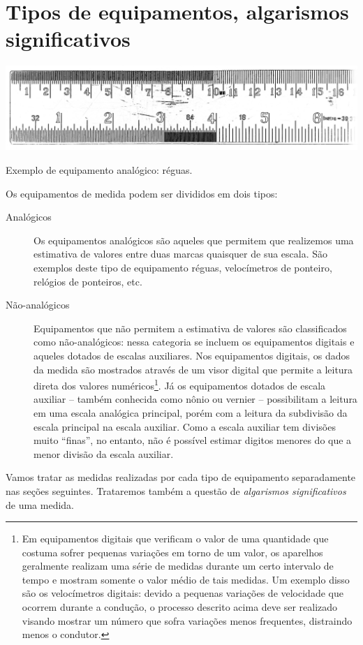 \section{Tipos de equipamentos, algarismos significativos}

\begin{marginfigure}
	\includegraphics[width=\textwidth]{Ilustrations/Regua.png}
	\caption{Exemplo de equipamento analógico: réguas.}
\end{marginfigure}

Os equipamentos de medida podem ser divididos em dois tipos:
\begin{description}
	\item[Analógicos] Os equipamentos analógicos são aqueles que permitem que realizemos uma estimativa de valores entre duas marcas quaisquer de sua escala. São exemplos deste tipo de equipamento réguas, velocímetros de ponteiro, relógios de ponteiros, etc.

	\item[Não-analógicos] Equipamentos que não permitem a estimativa de valores são classificados como não-analógicos: nessa categoria se incluem os equipamentos digitais e aqueles dotados de escalas auxiliares. Nos equipamentos digitais, os dados da medida são mostrados através de um visor digital que permite a leitura direta dos valores numéricos\footnote[][-2cm]{Em equipamentos digitais que verificam o valor de uma quantidade que costuma sofrer pequenas variações em torno de um valor, os aparelhos geralmente realizam uma série de medidas durante um certo intervalo de tempo e mostram somente o valor médio de tais medidas. Um exemplo disso são os velocímetros digitais: devido a pequenas variações de velocidade que ocorrem durante a condução, o processo descrito acima deve ser realizado visando mostrar um número que sofra variações menos frequentes, distraindo menos o condutor.}. Já os equipamentos dotados de escala auxiliar -- também conhecida como nônio ou vernier -- possibilitam a leitura em uma escala analógica principal, porém com a leitura da subdivisão da escala principal na escala auxiliar. Como a escala auxiliar tem divisões muito ``finas'', no entanto, não é possível estimar digitos menores do que a menor divisão da escala auxiliar.
\end{description}
Vamos tratar as medidas realizadas por cada tipo de equipamento separadamente nas seções seguintes. Trataremos também a questão de \emph{algarismos significativos} de uma medida.

